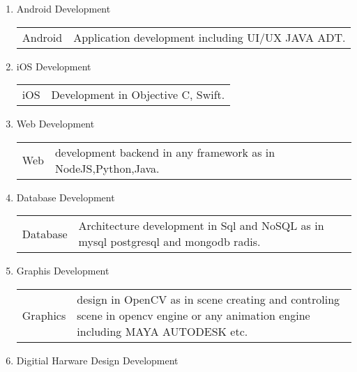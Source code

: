 \documentclass[letterpaper,11pt]{article}
\begin{document}
\begin{enumerate}
\item Android Development\\
 \begin{center}
	\begin{tabular}{p{3cm} p{13cm} }
	 Android&Application development including UI/UX JAVA ADT.\\
	\end{tabular}
 \end{center}
\item iOS Development\\
 \begin{center}
	\begin{tabular}{p{3cm} p{13cm} }
		iOS& Development in Objective C, Swift.\\
	\end{tabular}
 \end{center}
\item Web Development\\
 \begin{center}
	\begin{tabular}{p{3cm} p{13cm} }
		Web& development backend in any framework as in NodeJS,Python,Java.\\
	\end{tabular}
 \end{center}
\item Database Development\\
 \begin{center}
	\begin{tabular}{p{3cm} p{13cm} }
		Database& Architecture development in Sql and NoSQL as in mysql postgresql and mongodb radis.\\
	\end{tabular}
 \end{center}
\item Graphis Development\\
 \begin{center}
	\begin{tabular}{p{3cm} p{13cm} }
		Graphics& design in OpenCV as in scene creating and controling scene in opencv engine or any animation engine including MAYA AUTODESK etc.\\
	\end{tabular}
 \end{center}
\item Digitial Harware Design Development\\
 \begin{center}
	\begin{tabular}{p{3cm} p{13cm} }

\end{tabular}
\end{center}
\end{enumerate}
\end{document}

